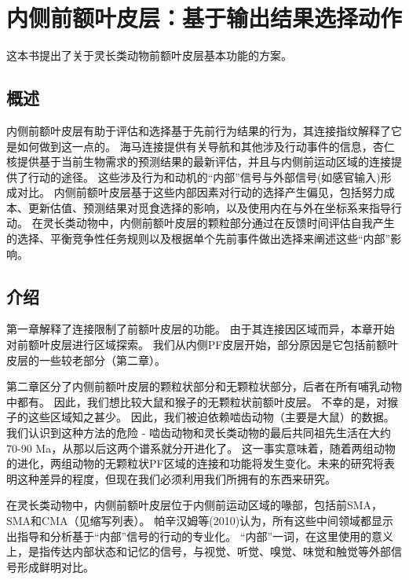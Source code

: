 \chapter{内侧前额叶皮层：基于输出结果选择动作} \label{chap:chap3}

这本书提出了关于灵长类动物前额叶皮层基本功能的方案。



\section{概述}
内侧前额叶皮层有助于评估和选择基于先前行为结果的行为，其连接指纹解释了它是如何做到这一点的。
海马连接提供有关导航和其他涉及行动事件的信息，杏仁核提供基于当前生物需求的预测结果的最新评估，并且与内侧前运动区域的连接提供了行动的途径。
这些涉及行为和动机的“内部”信号与外部信号(如感官输入)形成对比。
内侧前额叶皮层基于这些内部因素对行动的选择产生偏见，包括努力成本、更新估值、预测结果对觅食选择的影响，以及使用内在与外在坐标系来指导行动。
在灵长类动物中，内侧前额叶皮层的颗粒部分通过在反馈时间评估自我产生的选择、平衡竞争性任务规则以及根据单个先前事件做出选择来阐述这些“内部”影响。\par



\section{介绍}

第一章解释了连接限制了前额叶皮层的功能。
由于其连接因区域而异，本章开始对前额叶皮层进行区域探索。
我们从内侧PF皮层开始，部分原因是它包括前额叶皮层的一些较老部分（第二章）。\par

第二章区分了内侧前额叶皮层的颗粒状部分和无颗粒状部分，后者在所有哺乳动物中都有。
因此，我们想比较大鼠和猴子的无颗粒状前额叶皮层。
不幸的是，对猴子的这些区域知之甚少。
因此，我们被迫依赖啮齿动物（主要是大鼠）的数据。
我们认识到这种方法的危险 - 啮齿动物和灵长类动物的最后共同祖先生活在大约70-90 Ma，从那以后这两个谱系就分开进化了。
这一事实意味着，随着两组动物的进化，两组动物的无颗粒状PF区域的连接和功能将发生变化。未来的研究将表明这种差异的程度，但现在我们必须利用我们所拥有的东西来研究。\par


在灵长类动物中，内侧前额叶皮层位于内侧前运动区域的喙部，包括前SMA，SMA和CMA（见缩写列表）。
帕辛汉姆等(2010)认为，所有这些中间领域都显示出指导和分析基于“内部”信号的行动的专业化。
“内部”一词，在这里使用的意义上，是指传达内部状态和记忆的信号，与视觉、听觉、嗅觉、味觉和触觉等外部信号形成鲜明对比。



